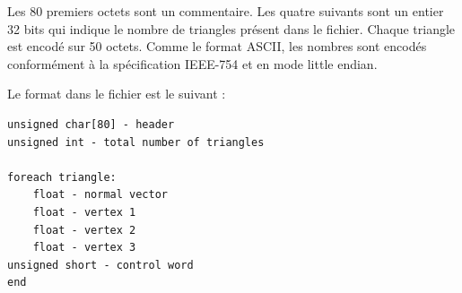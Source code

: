 Les 80 premiers octets sont un commentaire. Les quatre suivants sont un entier 32 bits qui indique le nombre de triangles présent dans le fichier.
Chaque triangle est encodé sur 50 octets. Comme le format ASCII, les nombres sont encodés conformément à la spécification IEEE-754 et en mode little endian.

Le format dans le fichier est le suivant : 

\begin{lstlisting}[frame=single]
unsigned char[80] - header
unsigned int - total number of triangles

foreach triangle:
    float - normal vector
    float - vertex 1
    float - vertex 2
    float - vertex 3
unsigned short - control word
end
\end{lstlisting}
